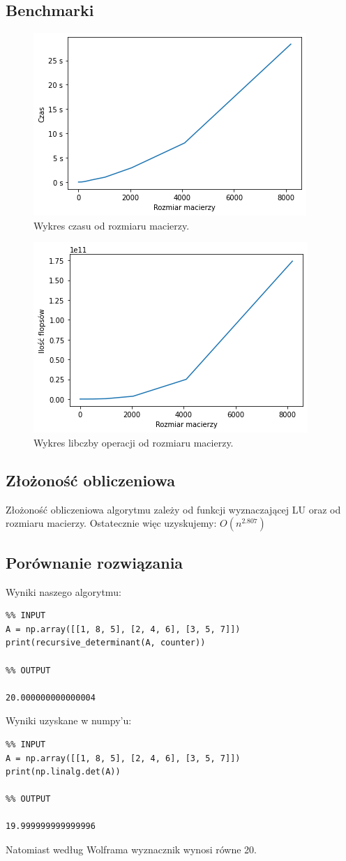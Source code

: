\documentclass{article}
\begin{document}
\subsection{Benchmarki}
\begin{center}
\begin{figure}[H]
  \includegraphics[width=0.6\linewidth]{img/det_time.png}
  \caption{Wykres czasu od rozmiaru macierzy.}
\end{figure}

\begin{figure}[H]
  \includegraphics[width=0.6\linewidth]{img/det_flops.png}
  \caption{Wykres libczby operacji od rozmiaru macierzy.}
\end{figure}
\end{center}
\subsection{Złożoność obliczeniowa}

\qquad Złożoność obliczeniowa algorytmu 
zależy od funkcji wyznaczającej LU oraz od rozmiaru macierzy. 
Ostatecznie więc uzyskujemy: $O(n^{2.807})$

\subsection{Porównanie rozwiązania}
Wyniki naszego algorytmu: \\
\begin{lstlisting}
%% INPUT
A = np.array([[1, 8, 5], [2, 4, 6], [3, 5, 7]])
print(recursive_determinant(A, counter))

%% OUTPUT

20.000000000000004
\end{lstlisting} 
Wyniki uzyskane w numpy'u: \\

\begin{lstlisting}
%% INPUT
A = np.array([[1, 8, 5], [2, 4, 6], [3, 5, 7]])
print(np.linalg.det(A))

%% OUTPUT

19.999999999999996
\end{lstlisting}
Natomiast według Wolframa wyznacznik wynosi równe 20.
\end{document}
